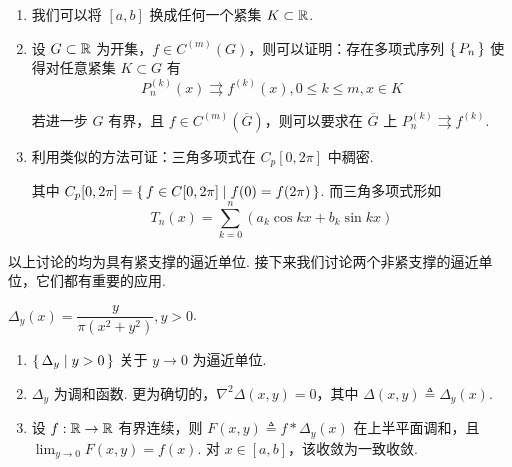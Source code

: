 \begin{hint}
    \begin{enumerate}
        \item 我们可以将 $[a,b]$ 换成任何一个紧集 $K\subset\mathbb{R}$.
        
        \item 设 $G\subset\mathbb{R}$ 为开集，$f\in C^{(m)}(G)$，则可以证明：存在多项式序列 $\set{P_n}$ 使得对任意紧集 $K\subset G$ 有
$$
P_n^{(k)}(x)\rightrightarrows f^{(k)}(x),0\le k\le m,x\in K
$$

        若进一步 $G$ 有界，且 $f\in C^{(m)}(\overline{G})$，则可以要求在 $\overline{G}$ 上 $P_n^{(k)}\rightrightarrows f^{(k)}$.

        \item 利用类似的方法可证：三角多项式在 $C_p[0,2\pi]$ 中稠密.
        
        其中 $C_p[0,2\pi]=\set{f\in C[0,2\pi]|f(0)=f(2\pi)}$. 而三角多项式形如
$$
T_n(x)=\sum_{k=0}^n(a_k\cos kx+b_k\sin kx)
$$
    \end{enumerate}
\end{hint}

以上讨论的均为具有紧支撑的逼近单位. 接下来我们讨论两个非紧支撑的逼近单位，它们都有重要的应用.

\begin{example}
    $\Delta_y(x)=\dfrac{y}{\pi(x^2+y^2)},y>0$.
\end{example}

\begin{property}
    \begin{enumerate}
        \item $\set{\Delta_y|y>0}$ 关于 $y\to 0$ 为逼近单位.
        
        \item $\Delta_y$ 为调和函数. 更为确切的，$\nabla^2\Delta(x,y)=0$，其中 $\Delta(x,y)\triangleq\Delta_y(x)$.
        
        \item 设 $f:\mathbb{R}\to\mathbb{R}$ 有界连续，则 $F(x,y)\triangleq f*\Delta_y(x)$ 在上半平面调和，且 $\displaystyle\lim_{y\to 0}F(x,y)=f(x)$. 对 $x\in[a,b]$，该收敛为一致收敛.
    \end{enumerate}
\end{property}
